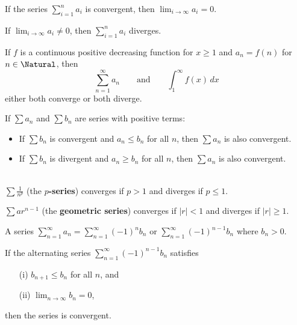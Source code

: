\begin{theorem} If the series $\sum_{i = 1}^n a_i$ is convergent, then $\lim_{i \to \infty} a_i = 0$.
\end{theorem}

\begin{theorem} If $\lim_{i \to \infty} a_i \neq 0$, then $\sum_{i = 1}^n a_i$ diverges.
\end{theorem}

\begin{theorem} If $f$ is a continuous positive decreasing function for $x \geq 1$ and $a_n = f(n)$ for $n \in \Natural$, then
  \[
    \sum_{n = 1}^\infty a_n \qquad \text{and} \qquad \int_1^\infty f(x) \,dx
  \]
    either both converge or both diverge.
\end{theorem}

\begin{theorem} If $\sum a_n$ and $\sum b_n$ are series with positive terms:
  \begin{itemize}
    \item If $\sum b_n$ is convergent and $a_n \leq b_n$ for all $n$, then $\sum a_n$ is also convergent.
    \item If $\sum b_n$ is divergent and $a_n \geq b_n$ for all $n$, then $\sum a_n$ is also convergent.
  \end{itemize}
\end{theorem}

\begin{theorem} \ \\
  $\sum \frac{1}{n^p}$ (the \textbf{$p$-series}) converges if $p > 1$ and diverges if $p \leq 1$.

  $\sum ar^{n-1}$ (the \textbf{geometric series}) converges if $|r| < 1$ and diverges if $|r| \geq 1$.
\end{theorem}

\begin{definition} A series $\sum_{n=1}^\infty a_n = \sum_{n=1}^\infty (-1)^n b_n \text{ or } \sum_{n=1}^\infty (-1)^{n - 1} b_n$ where $b_n > 0$.
\end{definition}

\begin{theorem} If the alternating series $\sum_{n=1}^\infty (-1)^{n - 1} b_n$ satisfies
  \begin{enumerate}
    \item[(i)] $b_{n + 1} \leq b_n$ for all $n$, and
    \item[(ii)] $\displaystyle\lim_{n \to \infty} b_n = 0$,
  \end{enumerate}
  then the series is convergent.
\end{theorem}

